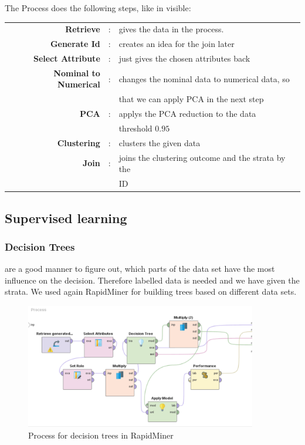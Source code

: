 The Process does the following steps, like in  visible:

\begin{tabular}{r c l}
	\textbf{Retrieve} & : & gives the data in the process.\\
	\textbf{Generate Id} & : & creates an idea for the join later\\
	\textbf{Select Attribute} & : & just gives the chosen attributes back\\
	\textbf{Nominal to Numerical} & : & changes the nominal data to numerical data, so \\
	&&that we can apply PCA in the next step \\
	\textbf{PCA} & : & applys the PCA reduction to the data\\
	&& threshold $0.95$ \\
	\textbf{Clustering} & : &  clusters the given data \\
	\textbf{Join} & : & joins the clustering outcome and the strata by the\\
	&& ID\\
\end{tabular}	
		
		
	\subsection{Supervised learning}
	
	\subsubsection{Decision Trees} are a good manner to figure out, which parts of the data set have the most influence on the decision. Therefore labelled data is needed and we have given the strata. We used again RapidMiner for building trees based on different data sets. 

	\vspace*{-2em}
	\begin{figure}[H]
		\centering
		\includegraphics[width = 0.9\textwidth]{DecisionTreeRapidModel.PNG}
		\caption{Process for decision trees in RapidMiner}
		\label{fig: RapDec}
		\vspace*{-1.5em}
	\end{figure}
	

